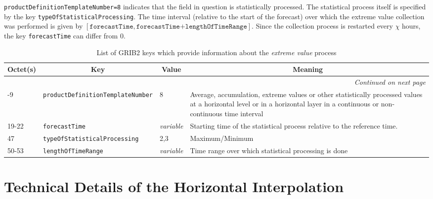 \texttt{productDefinitionTemplateNumber=8} indicates that the field in question is statistically processed. The statistical process itself 
is specified by the key \texttt{typeOfStatisticalProcessing}. The time interval (relative to the start of the forecast) over which the 
extreme value collection was performed is given by $[\texttt{forecastTime},\texttt{forecastTime+lengthOfTimeRange}]$. 
Since the collection process is restarted every $\chi$ hours, the key \texttt{forecastTime} can differ from 0. 

\begin{longtable}{p{1.2cm}p{5.5cm}p{1.0cm}p{6.0cm}}
\caption[]{List of GRIB2 keys which provide information about the \emph{extreme value} process}\label{tab_GRIB2extreme}\\
  \toprule
\multicolumn{1}{c}{\textbf{Octet(s)}}  &  \multicolumn{1}{c}{\textbf{Key}}  & \multicolumn{1}{c}{\textbf{Value}} & \multicolumn{1}{c}{\textbf{Meaning}} \\
\midrule
\endhead
\hline \multicolumn{4}{r}{\textit{Continued on next page}} \\
\endfoot
\endlastfoot
 8-9        &  \texttt{productDefinitionTemplateNumber}             &     8               &    Average, accumulation, extreme values or other statistically processed values at a horizontal level or in a horizontal layer in a continuous or non-continuous time interval   \\
 19-22      &  \texttt{forecastTime}                                &    \emph{variable}  &    Starting time of the statistical process relative to the reference time. \\
 47         &  \texttt{typeOfStatisticalProcessing}                 &     2,3             &    Maximum/Minimum                                  \\
 50-53      &  \texttt{lengthOfTimeRange}                           &    \emph{variable}  &    Time range over which statistical processing is done \\
\bottomrule
\end{longtable}



\section{Technical Details of the Horizontal Interpolation}
\label{section:technical_details_of_the_horizontal_interpolation}

